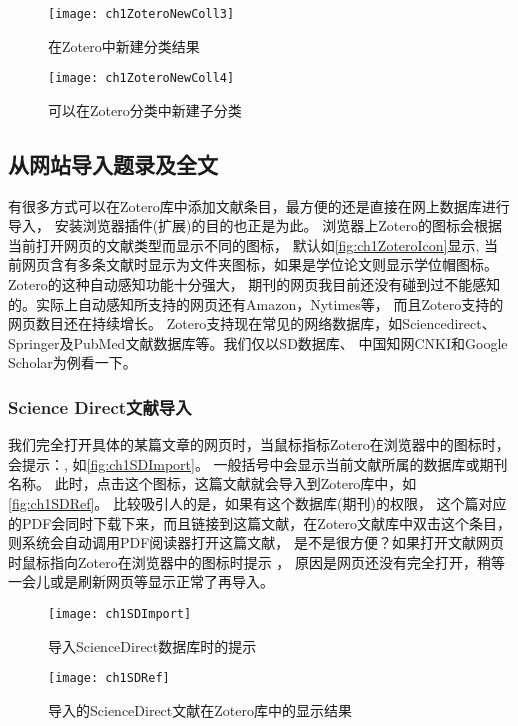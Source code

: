 \documentclass[cn,11pt,chinese]{elegantbook}
\begin{document}
\begin{enumerate}
			\begin{figure}[htbp]
				\begin{minipage}[t]{0.4\linewidth}
					\centering
					\texttt{[image: ch1ZoteroNewColl3]}
					\caption{在Zotero中新建分类结果}
					\label{fig:ch1ZoteroNewColl3}
				\end{minipage}
				\begin{minipage}[t]{0.7\linewidth}
					\centering
					\texttt{[image: ch1ZoteroNewColl4]}
					\caption{可以在Zotero分类中新建子分类}
					\label{fig:ch1ZoteroNewColl4}
				\end{minipage}
			\end{figure}
		\end{enumerate}
	\subsection{从网站导入题录及全文} \label{sec:ImportFromWeb}
		有很多方式可以在Zotero库中添加文献条目，最方便的还是直接在网上数据库进行导入，
		安装浏览器插件(扩展)的目的也正是为此。
		浏览器上Zotero的图标会根据当前打开网页的文献类型而显示不同的图标，
		默认如\autoref{fig:ch1ZoteroIcon}显示,
		当前网页含有多条文献时显示为文件夹图标，如果是学位论文则显示学位帽图标。
		Zotero的这种自动感知功能十分强大，
		期刊的网页我目前还没有碰到过不能感知的。实际上自动感知所支持的网页还有Amazon，Nytimes等，
		而且Zotero支持的网页数目还在持续增长。
		Zotero支持现在常见的网络数据库，如Sciencedirect、Springer及PubMed文献数据库等。我们仅以SD数据库、
		中国知网CNKI和Google Scholar为例看一下。
		\subsubsection{Science Direct文献导入}
		我们完全打开具体的某篇文章的网页时，当鼠标指标Zotero在浏览器中的图标时，
		会提示：, 如\autoref{fig:ch1SDImport}。
		一般括号中会显示当前文献所属的数据库或期刊名称。
		此时，点击这个图标，这篇文献就会导入到Zotero库中，如\autoref{fig:ch1SDRef}。
		比较吸引人的是，如果有这个数据库(期刊)的权限，
		这个篇对应的PDF会同时下载下来，而且链接到这篇文献，在Zotero文献库中双击这个条目，
		则系统会自动调用PDF阅读器打开这篇文献，
		是不是很方便？如果打开文献网页时鼠标指向Zotero在浏览器中的图标时提示
		，
		原因是网页还没有完全打开，稍等一会儿或是刷新网页等显示正常了再导入。
		\begin{figure}[htbp]
			\centering
			\texttt{[image: ch1SDImport]}
			\caption{导入ScienceDirect数据库时的提示}
			\label{fig:ch1SDImport}
		\end{figure}
		\begin{figure}
			\centering
			\texttt{[image: ch1SDRef]}
			\caption{导入的ScienceDirect文献在Zotero库中的显示结果}
			\label{fig:ch1SDRef}
		\end{figure}
\end{document}
